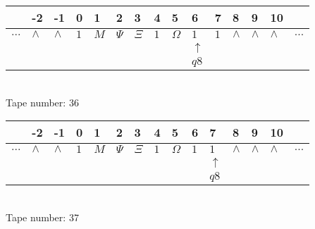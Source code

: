 \documentclass{article}
\begin{document}
\begin{table}[H]
\centering
\begin{tabular}{lllllllllllllll}
 & -2 & -1 & 0 & 1 & 2 & 3 & 4 & 5 & 6 & 7 & 8 & 9 & 10 & \\
\hline
$...$ & \multicolumn{1}{|l|}{$\wedge$} & \multicolumn{1}{|l|}{$\wedge$} & \multicolumn{1}{|l|}{$1$} & \multicolumn{1}{|l|}{$M$} & \multicolumn{1}{|l|}{$\Psi$} & \multicolumn{1}{|l|}{$\Xi$} & \multicolumn{1}{|l|}{$1$} & \multicolumn{1}{|l|}{$\Omega$} & \multicolumn{1}{|l|}{$1$} & \multicolumn{1}{|l|}{$1$} & \multicolumn{1}{|l|}{$\wedge$} & \multicolumn{1}{|l|}{$\wedge$} & \multicolumn{1}{|l|}{$\wedge$} & $...$\\
\hline
&  &  &  &  &  &  &  &  & $\uparrow$ &  &  &  &  &  \\
&  &  &  &  &  &  &  &  & $ q8 $ &  &  &  &  &  \\
\end{tabular}
\\
Tape number: 36
\noindent\makebox[\linewidth]{\hdashrule{\textwidth}{1pt}{1pt}}\end{table}

\begin{table}[H]
\centering
\begin{tabular}{lllllllllllllll}
 & -2 & -1 & 0 & 1 & 2 & 3 & 4 & 5 & 6 & 7 & 8 & 9 & 10 & \\
\hline
$...$ & \multicolumn{1}{|l|}{$\wedge$} & \multicolumn{1}{|l|}{$\wedge$} & \multicolumn{1}{|l|}{$1$} & \multicolumn{1}{|l|}{$M$} & \multicolumn{1}{|l|}{$\Psi$} & \multicolumn{1}{|l|}{$\Xi$} & \multicolumn{1}{|l|}{$1$} & \multicolumn{1}{|l|}{$\Omega$} & \multicolumn{1}{|l|}{$1$} & \multicolumn{1}{|l|}{$1$} & \multicolumn{1}{|l|}{$\wedge$} & \multicolumn{1}{|l|}{$\wedge$} & \multicolumn{1}{|l|}{$\wedge$} & $...$\\
\hline
&  &  &  &  &  &  &  &  &  & $\uparrow$ &  &  &  &  \\
&  &  &  &  &  &  &  &  &  & $ q8 $ &  &  &  &  \\
\end{tabular}
\\
Tape number: 37
\noindent\makebox[\linewidth]{\hdashrule{\textwidth}{1pt}{1pt}}\end{table}
\end{document}
